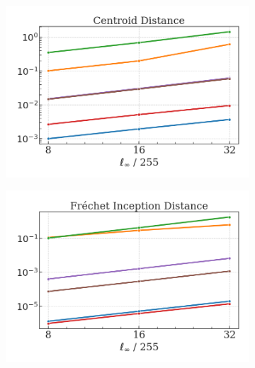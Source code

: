 \begin{figure}[H]
    \centering
    \begin{subfigure}[b]{0.22\textwidth}
        \centering
        \includegraphics[width=\textwidth]{img/results_discussion/adversarial/PGD_CD_eps.png}
    \end{subfigure}
    \hfill
    \begin{subfigure}[b]{0.22\textwidth}
        \centering
        \includegraphics[width=\textwidth]{img/results_discussion/adversarial/PGD_FID_eps.png}
    \end{subfigure}
    \hfill
    \begin{subfigure}[b]{0.22\textwidth}
        \centering

\end{subfigure}
\end{figure}
